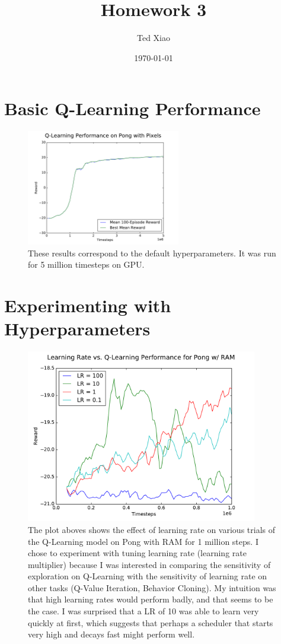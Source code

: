 \documentclass{article}%
\begin{document}
\title{Homework 3}
\author{Ted Xiao}
\date{\today}
\maketitle

\section{Basic Q-Learning Performance}
\begin{figure}[h]
    \center
		\includegraphics[width=0.6\textwidth]{lr1_images_plot.pdf}
    \caption{These results correspond to the default hyperparameters. It was run for 5 million timesteps on GPU.}
\end{figure}

\newpage
\section{Experimenting with Hyperparameters}

\begin{figure}[h]
  \centering
     \includegraphics[width=0.9\textwidth]{lr_plot.pdf}
  \caption{The plot aboves shows the effect of learning rate on various trials of the Q-Learning model on Pong with RAM for 1 million steps. I chose to experiment with tuning learning rate (learning rate multiplier) because I was interested in comparing the sensitivity of exploration on Q-Learning with the sensitivity of learning rate on other tasks (Q-Value Iteration, Behavior Cloning). My intuition was that high learning rates would perform badly, and that seems to be the case. I was surprised that a LR of 10 was able to learn very quickly at first, which suggests that perhaps a scheduler that starts very high and decays fast might perform well.}
\end{figure}
\end{document}
